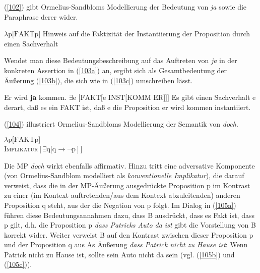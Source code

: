 (\ref{102}) gibt Ormelius-Sandbloms Modellierung der Bedeutung von \textit{ja} sowie die Paraphrase derer wider.

\begin{exe}
	\ex\label{102} 
		\begin{xlist}	
			\ex\label{102a} $\lambda \textrm{p[FAKTp]}$
			\ex\label{102b} Hinweis auf die Faktizität der Instantiierung der Proposition durch einen Sachverhalt 
			\hfill\hbox {\citet[82]{Ormelius-Sandblom1997}}
		\end{xlist}
\end{exe}
Wendet man diese Bedeutungsbeschreibung auf das Auftreten von \textit{ja} in der konkre\-ten Assertion in (\ref{103a}) an, ergibt sich als Gesamtbedeutung der Äußerung (\ref{103b}), die sich wie in (\ref{103c}) umschreiben lässt.
\begin{exe}
	\ex\label{103} 
		\begin{xlist}	
			\ex\label{103a} Er wird \textbf{ja} kommen.  
			\ex\label{103b} $\exists \textrm{e [FAKT[e INST[KOMM ER}]]]$
			\ex\label{103c} \glq Es gibt einen Sachverhalt e derart, daß es ein FAKT ist, daß e die Proposition \glq er wird kommen\grq {} instantiiert\grq 			{}.                                    
			\hfill\hbox {\citet[89]{Ormelius-Sandblom1997}}
		\end{xlist}		
\end{exe}
(\ref{104}) illustriert Ormelius-Sandbloms Modellierung der Semantik von \textit{doch}.

\begin{exe}
	\ex\label{104} 
		$\lambda \textrm{p[FAKTp}]$\\
		\textsc{Implikatur}$[\exists \textrm{q[q} \rightarrow \neg \textrm{p}]]$
			\hfill\hbox {\citet[83]{Ormelius-Sandblom1997}}
\end{exe}
Die MP \textit{doch} wirkt ebenfalls affirmativ. Hinzu tritt eine adversative Komponente (von Ormelius-Sandblom modelliert  als \textit{konventionelle Implikatur}), die darauf verweist, dass die in der MP-Äußerung ausgedrückte Proposition p im Kontrast zu einer (im Kontext auftretenden/aus dem Kontext abzuleitenden) anderen Proposition q steht, aus der die Negation von p folgt. Im Dialog in (\ref{105a}) führen diese Bedeutungsannahmen dazu, dass B ausdrückt, dass es Fakt ist, dass p gilt, d.h. die Proposition p \textit{dass Patricks Auto da ist} gibt die Vorstellung von B korrekt wider. Weiter verweist B auf den Kontrast zwischen dieser Proposition p und der Proposition q aus As Äußerung \textit{dass Patrick nicht zu Hause ist}: Wenn Patrick nicht zu Hause ist, sollte sein Auto nicht da sein (vgl. (\ref{105b}) und (\ref{105c})).

